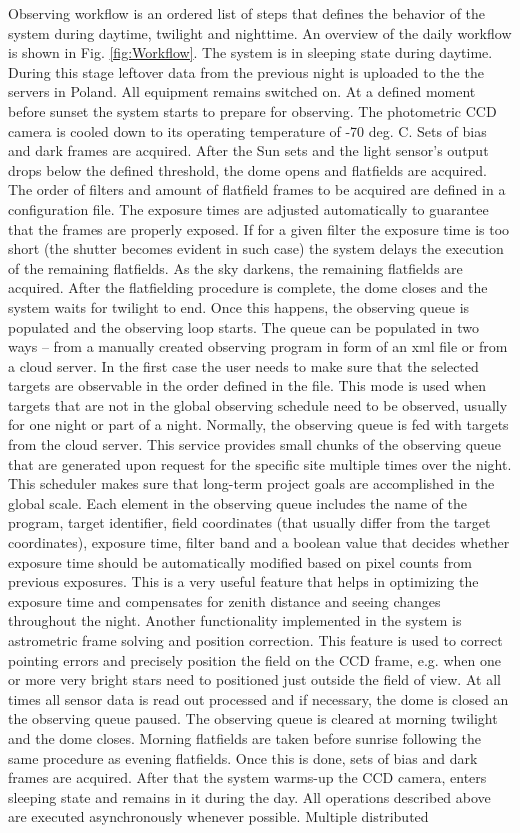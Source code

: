 Observing workflow is an ordered list of steps that defines the behavior of the system during daytime, twilight and nighttime. An overview of the daily workflow is shown in Fig. \ref{fig:Workflow}. The system is in sleeping state during daytime. During this stage leftover data from the previous night is uploaded to the the servers in Poland. All equipment remains switched on. At a defined moment before sunset the system starts to prepare for observing. The photometric CCD camera is cooled down to its operating temperature of -70 deg. C. Sets of bias and dark frames are acquired. After the Sun sets and the light sensor's output drops below the defined threshold, the dome opens and flatfields are acquired. The order of filters and amount of flatfield frames to be acquired are defined in a configuration file. The exposure times are adjusted automatically to guarantee that the frames are properly exposed. If for a given filter the exposure time is too short (the shutter becomes evident in such case) the system delays the execution of the remaining flatfields. As the sky darkens, the remaining flatfields are acquired. After the flatfielding procedure is complete, the dome closes and the system waits for twilight to end. Once this happens, the observing queue is populated and the observing loop starts. The queue can be populated in two ways -- from a manually created observing program  in form of an xml file or from a cloud server. In the first case the user needs to make sure that the selected targets are observable in the order defined in the file. This mode is used when targets that are not in the global observing schedule need to be observed, usually for one night or part of a night. Normally, the observing queue is fed with targets from the cloud server. This service provides small chunks of the observing queue that are generated upon request for the specific site multiple times over the night. This scheduler makes sure that long-term project goals are accomplished in the global scale. Each element in the observing queue includes the name of the program, target identifier, field coordinates (that usually differ from the target coordinates), exposure time, filter band and a boolean value that decides whether exposure time should be automatically modified based on pixel counts from previous exposures. This is a very useful feature that helps in optimizing the exposure time and compensates for zenith distance and seeing changes throughout the night. Another functionality implemented in the system is astrometric frame solving and position correction. This feature is used to correct pointing errors and precisely position the field on the CCD frame, e.g. when one or more very bright stars need to positioned just outside the field of view. At all times all sensor data is read out processed and if necessary, the dome is closed an the observing queue paused. The observing queue is cleared at morning twilight and the dome closes. Morning flatfields are taken before sunrise following the same procedure as evening flatfields. Once this is done, sets of bias and dark frames are acquired. After that the system warms-up the CCD camera, enters sleeping state and remains in it during the day. All operations described above are executed asynchronously whenever possible. Multiple distributed 
